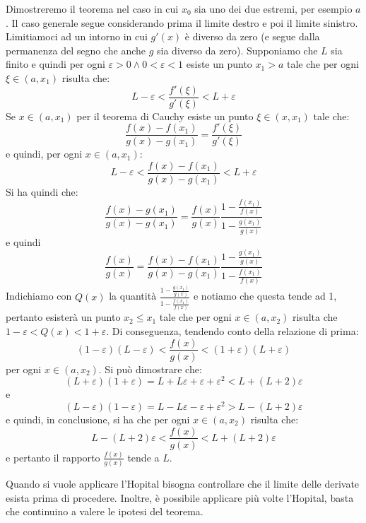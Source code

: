 \documentclass{report}
\begin{document}
\begin{myproof}
Dimostreremo il teorema nel caso in cui $x_0$ sia uno dei due estremi, per esempio $a$. Il caso generale segue considerando prima il limite destro e poi il limite sinistro. \\
Limitiamoci ad un intorno in cui $g'(x)$ è diverso da zero (e segue dalla permanenza del segno che anche $g$ sia diverso da zero). Supponiamo che $L$ sia finito e quindi per ogni $\varepsilon > 0 \wedge 0<\varepsilon<1$ esiste un punto $x_1>a$ tale che per ogni $\xi \in (a, x_1)$ risulta che:
$$
	L - \varepsilon < \frac{f'(\xi)}{g'(\xi)} < L + \varepsilon
$$
Se $x \in (a, x_1)$ per il teorema di Cauchy esiste un punto $\xi \in (x, x_1)$ tale che:
$$
	\frac{f(x)-f(x_1)}{g(x)-g(x_1)} = \frac{f'(\xi)}{g'(\xi)}
$$
e quindi, per ogni $x \in (a, x_1)$:
$$
	L - \varepsilon < \frac{f(x)-f(x_1)}{g(x)-g(x_1)} < L + \varepsilon
$$
Si ha quindi che:
$$
	\frac{f(x)-g(x_1)}{g(x)-g(x_1)} = \frac{f(x)}{g(x)}\frac{1-\frac{f(x_1)}{f(x)}}{1-\frac{g(x_1)}{g(x)}}
$$
e quindi
$$
	\frac{f(x)}{g(x)} = \frac{f(x)-f(x_1)}{g(x)-g(x_1)}\frac{1-\frac{g(x_1)}{g(x)}}{1-\frac{f(x_1)}{f(x)}}
$$
Indichiamo con $Q(x)$ la quantità $\frac{1-\frac{g(x_1)}{g(x)}}{1-\frac{f(x_1)}{f(x)}}$ e notiamo che questa tende ad 1, pertanto esisterà un punto $x_2 \leq x_1$ tale che per ogni $x \in (a, x_2)$ risulta che $1-\varepsilon < Q(x) < 1+\varepsilon$. Di conseguenza, tendendo conto della relazione di prima:
$$
	(1-\varepsilon)(L-\varepsilon) < \frac{f(x)}{g(x)} < (1+\varepsilon)(L+\varepsilon)
$$
per ogni $x \in (a, x_2)$. Si può dimostrare che:
$$
(L+\varepsilon)(1+\varepsilon) = L + L\varepsilon + \varepsilon + \varepsilon^2 < L+(L+2)\varepsilon
$$
e
$$
(L - \varepsilon)(1 - \varepsilon) = L - L\varepsilon - \varepsilon + \varepsilon^2 > L - (L + 2)\varepsilon
$$
e quindi, in conclusione, si ha che per ogni $x \in (a, x_2)$ risulta che:
$$
	L - (L+2)\varepsilon < \frac{f(x)}{g(x)} < L + (L+2)\varepsilon
$$
e pertanto il rapporto $\frac{f(x)}{g(x)}$ tende a $L$.
\end{myproof}
\par\smallskip\noindent Quando si vuole applicare l'Hopital bisogna controllare che il limite delle derivate esista prima di procedere. Inoltre, è possibile applicare più volte l'Hopital, basta che continuino a valere le ipotesi del teorema.
\end{document}
